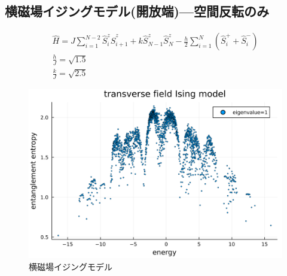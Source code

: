 \documentclass{ltjsarticle}
\begin{document}
\subsection*{横磁場イジングモデル(開放端)—空間反転のみ}
\begin{gather}
  \hat{H}=J\sum_{i=1}^{N-2} \hat{S}_i^z\hat{S}_{i+1}^z + k\hat{S}_{N-1}^z\hat{S}_{N}^z - \frac{h}{2}\sum_{i=1}^{N} \left( \hat{S}_i^+ + \hat{S}_i^- \right)\\
  \frac{h}{J}=\sqrt{1.5}\\
  \frac{k}{J}=\sqrt{2.5}
\end{gather}
\begin{figure}[H]
  \centering
  \includegraphics[width=150mm]{entropy_spinflip.png}
  \caption{横磁場イジングモデル}
  \label{fig:entropy_spinflip}
\end{figure}
\end{document}
